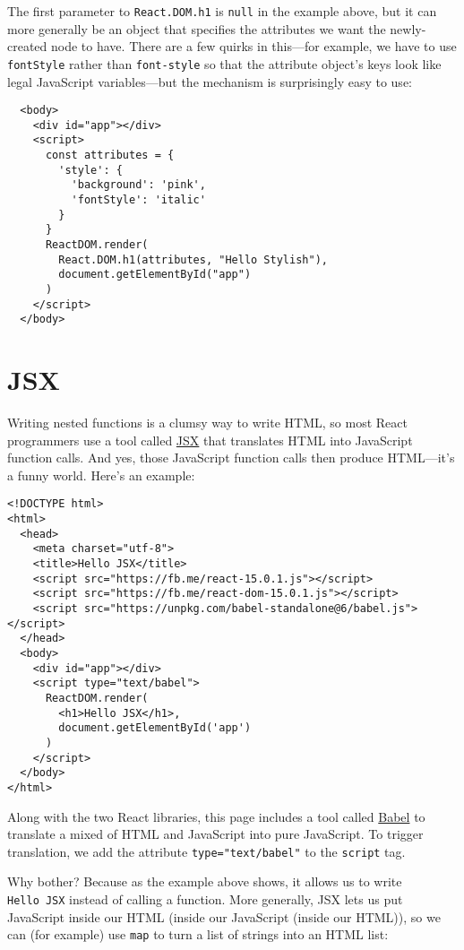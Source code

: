 The first parameter to \texttt{React.DOM.h1} is \texttt{null} in the example above,
but it can more generally be an object that specifies
the attributes we want the newly-created node to have.
There are a few quirks in this---for example,
we have to use \texttt{fontStyle} rather than \texttt{font-style}
so that the attribute object's keys look like legal JavaScript variables---but
the mechanism is surprisingly easy to use:

\begin{verbatim}
  <body>
    <div id="app"></div>
    <script>
      const attributes = {
        'style': {
          'background': 'pink',
          'fontStyle': 'italic'
        }
      }
      ReactDOM.render(
        React.DOM.h1(attributes, "Hello Stylish"),
        document.getElementById("app")
      )
    </script>
  </body>
\end{verbatim}

\section{JSX}\label{s:dynamic-jsx}

Writing nested functions is a clumsy way to write HTML,
so most React programmers use a tool called \href{https://reactjs.org/docs/introducing-jsx.html}{JSX}
that translates HTML into JavaScript function calls.
And yes,
those JavaScript function calls then produce HTML---it's a funny world.
Here's an example:

\begin{verbatim}
<!DOCTYPE html>
<html>
  <head>
    <meta charset="utf-8">
    <title>Hello JSX</title>
    <script src="https://fb.me/react-15.0.1.js"></script>
    <script src="https://fb.me/react-dom-15.0.1.js"></script>
    <script src="https://unpkg.com/babel-standalone@6/babel.js"></script>
  </head>
  <body>
    <div id="app"></div>
    <script type="text/babel">
      ReactDOM.render(
        <h1>Hello JSX</h1>,
        document.getElementById('app')
      )
    </script>
  </body>
</html>
\end{verbatim}

Along with the two React libraries,
this page includes a tool called \href{https://babeljs.io/}{Babel}
to translate a mixed of HTML and JavaScript into pure JavaScript.
To trigger translation,
we add the attribute \texttt{type="text/babel"} to the \texttt{script} tag.

Why bother?
Because as the example above shows,
it allows us to write \texttt{Hello\ JSX} instead of calling a function.
More generally,
JSX lets us put JavaScript inside our HTML (inside our JavaScript (inside our HTML)),
so we can (for example) use \texttt{map} to turn a list of strings into an HTML list:

